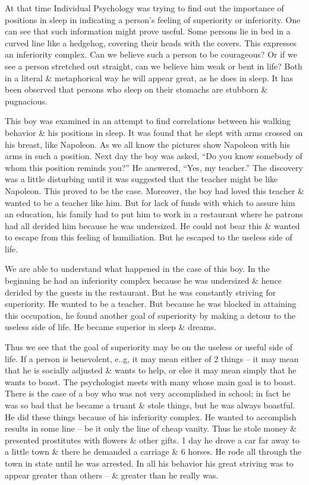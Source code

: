 \documentclass{article}
\numberwithin{equation}{section}
\begin{document}
At that time Individual Psychology was trying to find out the importance of positions in sleep in indicating a person's feeling of superiority or inferiority. One can see that such information might prove useful. Some persons lie in bed in a curved line like a hedgehog, covering their heads with the covers. This expresses an inferiority complex. Can we believe such a person to be courageous? Or if we see a person stretched out straight, can we believe him weak or bent in life? Both in a literal \& metaphorical way he will appear great, as he does in sleep. It has been observed that persons who sleep on their stomachs are stubborn \& pugnacious.

This boy was examined in an attempt to find correlations between his walking behavior \& his positions in sleep. It was found that he slept with arms crossed on his breast, like Napoleon. As we all know the pictures show Napoleon with his arms in such a position. Next day the boy was asked, ``Do you know somebody of whom this position reminds you?'' He answered, ``Yes, my teacher.'' The discovery was a little disturbing until it was suggested that the teacher might be like Napoleon. This proved to be the case. Moreover, the boy had loved this teacher \& wanted to be a teacher like him. But for lack of funds with which to assure him an education, his family had to put him to work in a restaurant where he patrons had all derided him because he was undersized. He could not bear this \& wanted to escape from this feeling of humiliation. But he escaped to the useless side of life.

We are able to understand what happened in the case of this boy. In the beginning he had an inferiority complex because he was undersized \& hence derided by the guests in the restaurant. But he was constantly striving for superiority. He wanted to be a teacher. But because he was blocked in attaining this occupation, he found another goal of superiority by making a detour to the useless side of life. He became superior in sleep \& dreams.

Thus we see that the goal of superiority may be on the useless or useful side of life. If a person is benevolent, e..g, it may mean either of 2 things -- it may mean that he is socially adjusted \& wants to help, or else it may mean simply that he wants to boast. The psychologist meets with many whose main goal is to boast. There is the case of a boy who was not very accomplished in school; in fact he was so bad that he became a truant \& stole things, but he was always boastful. He did these things because of his inferiority complex. He wanted to accomplish results in some line -- be it only the line of cheap vanity. Thus he stole money \& presented prostitutes with flowers \& other gifts. 1 day he drove a car far away to a little town \& there he demanded a carriage \& 6 horses. He rode all through the town in state until he was arrested. In all his behavior his great striving was to appear greater than others -- \& greater than he really was.
\end{document}
